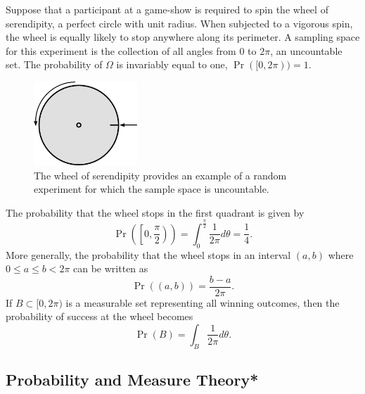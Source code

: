 \begin{example}
Suppose that a participant at a game-show is required to spin the wheel of serendipity, a perfect circle with unit radius.
When subjected to a vigorous spin, the wheel is equally likely to stop anywhere along its perimeter.
A sampling space for this experiment is the collection of all angles from $0$ to $2 \pi$, an uncountable set.
The probability of $\Omega$ is invariably equal to one, $\Pr ([0, 2 \pi)) = 1$.

\begin{figure}[tbh!]
\begin{center}
\includegraphics[height=3.15cm]{Figures/2Chapter/wheel}
\caption{The wheel of serendipity provides an example of a random experiment for which the sample space is uncountable.}
\end{center}
\end{figure}

The probability that the wheel stops in the first quadrant is given by
\begin{equation*}
\Pr \left( \left[ 0, \frac{\pi}{2} \right) \right)
= \int_{0}^{\frac{\pi}{2}} \frac{1}{2 \pi} d\theta
= \frac{1}{4}.
\end{equation*}
More generally, the probability that the wheel stops in an interval $(a, b)$ where $0 \leq a \leq b < 2 \pi$ can be written as
\begin{equation*}
\Pr ((a,b)) = \frac{b - a}{2 \pi}.
\end{equation*}
If $B \subset [0, 2 \pi)$ is a measurable set representing all winning outcomes, then the probability of success at the wheel becomes
\begin{equation*}
\Pr(B) = \int_B \frac{1}{2 \pi} d\theta .
\end{equation*}
\end{example}


\subsection{Probability and Measure Theory*}


